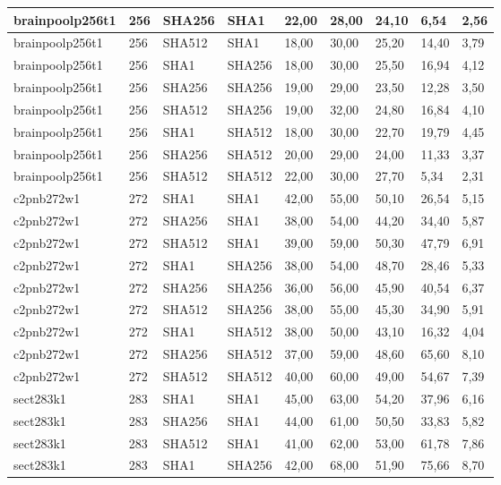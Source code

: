 \begin{longtable}{| l | l | l | l | l |l |l |l |l |}
brainpoolp256t1 & 256 & SHA256 & SHA1 & 22,00 & 28,00 & 24,10 & 6,54 & 2,56 \\ \hline 
brainpoolp256t1 & 256 & SHA512 & SHA1 & 18,00 & 30,00 & 25,20 & 14,40 & 3,79 \\ \hline 
brainpoolp256t1 & 256 & SHA1 & SHA256 & 18,00 & 30,00 & 25,50 & 16,94 & 4,12 \\ \hline 
brainpoolp256t1 & 256 & SHA256 & SHA256 & 19,00 & 29,00 & 23,50 & 12,28 & 3,50 \\ \hline 
brainpoolp256t1 & 256 & SHA512 & SHA256 & 19,00 & 32,00 & 24,80 & 16,84 & 4,10 \\ \hline 
brainpoolp256t1 & 256 & SHA1 & SHA512 & 18,00 & 30,00 & 22,70 & 19,79 & 4,45 \\ \hline 
brainpoolp256t1 & 256 & SHA256 & SHA512 & 20,00 & 29,00 & 24,00 & 11,33 & 3,37 \\ \hline 
brainpoolp256t1 & 256 & SHA512 & SHA512 & 22,00 & 30,00 & 27,70 & 5,34 & 2,31 \\ \hline 
c2pnb272w1 & 272 & SHA1 & SHA1 & 42,00 & 55,00 & 50,10 & 26,54 & 5,15 \\ \hline 
c2pnb272w1 & 272 & SHA256 & SHA1 & 38,00 & 54,00 & 44,20 & 34,40 & 5,87 \\ \hline 
c2pnb272w1 & 272 & SHA512 & SHA1 & 39,00 & 59,00 & 50,30 & 47,79 & 6,91 \\ \hline 
c2pnb272w1 & 272 & SHA1 & SHA256 & 38,00 & 54,00 & 48,70 & 28,46 & 5,33 \\ \hline 
c2pnb272w1 & 272 & SHA256 & SHA256 & 36,00 & 56,00 & 45,90 & 40,54 & 6,37 \\ \hline 
c2pnb272w1 & 272 & SHA512 & SHA256 & 38,00 & 55,00 & 45,30 & 34,90 & 5,91 \\ \hline 
c2pnb272w1 & 272 & SHA1 & SHA512 & 38,00 & 50,00 & 43,10 & 16,32 & 4,04 \\ \hline 
c2pnb272w1 & 272 & SHA256 & SHA512 & 37,00 & 59,00 & 48,60 & 65,60 & 8,10 \\ \hline 
c2pnb272w1 & 272 & SHA512 & SHA512 & 40,00 & 60,00 & 49,00 & 54,67 & 7,39 \\ \hline 
sect283k1 & 283 & SHA1 & SHA1 & 45,00 & 63,00 & 54,20 & 37,96 & 6,16 \\ \hline 
sect283k1 & 283 & SHA256 & SHA1 & 44,00 & 61,00 & 50,50 & 33,83 & 5,82 \\ \hline 
sect283k1 & 283 & SHA512 & SHA1 & 41,00 & 62,00 & 53,00 & 61,78 & 7,86 \\ \hline 
sect283k1 & 283 & SHA1 & SHA256 & 42,00 & 68,00 & 51,90 & 75,66 & 8,70 \\ \hline 

\end{longtable}
